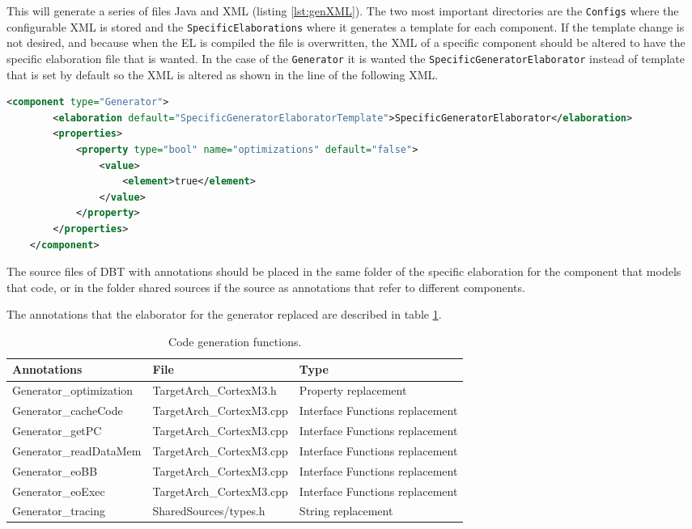 This will generate a series of files Java and XML (listing \ref{lst:genXML}). The two most important directories are the \texttt{Configs} where the configurable XML is stored and the \texttt{SpecificElaborations} where it generates a template for each component. 
If the template change is not desired, and because when the EL is compiled the file is overwritten, the XML of a specific component should be altered to have the specific elaboration file that is wanted.
In the case of the \texttt{Generator} it is wanted the \texttt{SpecificGeneratorElaborator} instead of template that is set by default so the XML is altered as shown in the line  of the following XML.
\begin{lstlisting}[language=XML, caption=Generator XML., label=lst:genXML]
	<component type="Generator">
		<elaboration default="SpecificGeneratorElaboratorTemplate">SpecificGeneratorElaborator</elaboration>
		<properties>
			<property type="bool" name="optimizations" default="false">
				<value>
					<element>true</element>
				</value>
			</property>
		</properties>
	</component>
\end{lstlisting}

The source files of DBT with annotations should be placed in the same folder of the specific elaboration for the component that models that code, or in the folder shared sources if the source as annotations that refer to different components. 

The annotations that the elaborator for the generator replaced are described in table \ref{annotationTable}.
\begin{table}[h]
	\caption{Code generation functions.}
	\label{annotationTable}
	\centering
	\begin{tabular}{|l||l||l|}
		\hline
		\textbf{Annotations} 	& \textbf{File} 			& \textbf{Type}\\ \hline
		Generator\_optimization & TargetArch\_CortexM3.h 	& Property replacement \\ \hline
		Generator\_cacheCode	& TargetArch\_CortexM3.cpp	& Interface Functions replacement \\ \hline
		Generator\_getPC		& TargetArch\_CortexM3.cpp	& Interface Functions replacement \\ \hline
		Generator\_readDataMem	& TargetArch\_CortexM3.cpp	& Interface Functions replacement \\ \hline
		Generator\_eoBB			& TargetArch\_CortexM3.cpp	& Interface Functions replacement \\ \hline
		Generator\_eoExec		& TargetArch\_CortexM3.cpp	& Interface Functions replacement \\ \hline
		Generator\_tracing		& SharedSources/types.h		& String replacement \\ \hline
		
	\end{tabular}
\end{table}	


